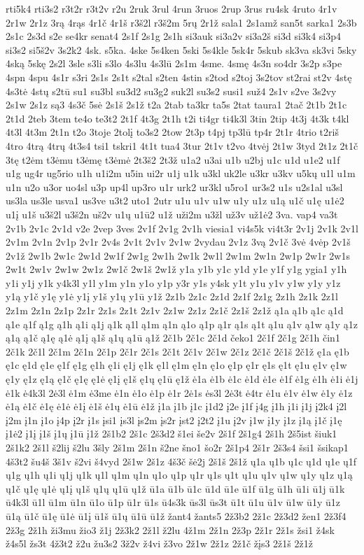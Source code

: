 {rti5k4
rti3s2
r3t2r
r3t2v
r2u
2ruk
3rul
4run
3ruos
2rup
3rus
ru4sk
4ruto
4r1v
2r1w
2r1z
3rą
4rąs
4r1č
4r1š
r3š2l
r3š2m
5rų
2r1ž
sala1
2s1amž
san5t
sarka1
2s3b
2s1c
2s3d
s2e
se4kr
senat4
2s1f
2s1g
2s1h
si3auk
si3a2v
si3a2š
si3d
si3k4
si3p4
si3s2
si5š2v
3s2k2
4sk.
s5ka.
4ske
5s4ken
5ski
5s4kle
5sk4r
5skub
sk3va
sk3vi
5sky
4ską
5skę
2s2l
3sle
s3li
s3lo
4s3lu
4s3lū
2s1m
4sme.
4smę
4s3n
so4dr
3s2p
s3pe
4spn
4spu
4s1r
s3ri
2s1s
2s1t
s2tal
s2ten
4stin
s2tod
s2toj
3s2tov
st2rai
st2v
4stę
4s3tė
4stų
s2tū
su1
su3bl
su3d2
su3g2
suk2l
su3s2
susi1
suž4
2s1v
s2ve
3s2vy
2s1w
2s1z
są3
4s3č
5sė
2s1š
2s1ž
t2a
2tab
ta3kr
ta5s
2tat
taura1
2tač
2t1b
2t1c
2t1d
2teb
3tem
te4o
te3t2
2t1f
4t3g
2t1h
t2i
ti4gr
ti4k3l
3tin
2tip
4t3j
4t3k
t4kl
4t3l
4t3m
2t1n
t2o
3toje
2tolį
to3s2
2tow
2t3p
t4pj
tp3lū
tp4r
2t1r
4trio
t2riš
4tro
4trą
4trų
4t3s4
tsi1
tskri1
4t1t
tua4
3tur
2t1v
t2vo
4tvėj
2t1w
3tyd
2t1z
2t1č
3tę
t2ėm
t3ėmu
t3ėmę
t3ėmė
2t3š2
2t3ž
u1a2
u3ai
u1b
u2bj
u1c
u1d
u1e2
u1f
u1g
ug4r
ug5rio
u1h
u1i2m
u5in
ui2r
u1j
u1k
u3kl
uk2le
u3kr
u3kv
u5kų
u1l
u1m
u1n
u2o
u3or
uo4sl
u3p
up4l
up3ro
u1r
urk2
ur3kl
u5ro1
ur3s2
u1s
u2s1al
u3sl
us3la
us3le
usva1
us3ve
u3t2
uto1
2utr
u1u
u1v
u1w
u1y
u1z
u1ą
u1č
u1ę
u1ė2
u1į
u1š
u3š2l
u3š2n
uš2v
u1ų
u1ū2
u1ž
uži2m
u3žl
už3v
už1ė2
3va.
vap4
va3t
2v1b
2v1c
2v1d
v2e
2vep
3ves
2v1f
2v1g
2v1h
viesia1
vi4s5k
vi4t3r
2v1j
2v1k
2v1l
2v1m
2v1n
2v1p
2v1r
2v4s
2v1t
2v1v
2v1w
2vydau
2v1z
3vą
2v1č
3vė
4vėp
2v1š
2v1ž
2w1b
2w1c
2w1d
2w1f
2w1g
2w1h
2w1k
2w1l
2w1m
2w1n
2w1p
2w1r
2w1s
2w1t
2w1v
2w1w
2w1z
2w1č
2w1š
2w1ž
y1a
y1b
y1c
y1d
y1e
y1f
y1g
ygia1
y1h
y1i
y1j
y1k
y4k3l
y1l
y1m
y1n
y1o
y1p
y3r
y1s
y4sk
y1t
y1u
y1v
y1w
y1y
y1z
y1ą
y1č
y1ę
y1ė
y1į
y1š
y1ų
y1ū
y1ž
2z1b
2z1c
2z1d
2z1f
2z1g
2z1h
2z1k
2z1l
2z1m
2z1n
2z1p
2z1r
2z1s
2z1t
2z1v
2z1w
2z1z
2z1č
2z1š
2z1ž
ą1a
ą1b
ą1c
ą1d
ą1e
ą1f
ą1g
ą1h
ą1i
ą1j
ą1k
ą1l
ą1m
ą1n
ą1o
ą1p
ą1r
ą1s
ą1t
ą1u
ą1v
ą1w
ą1y
ą1z
ą1ą
ą1č
ą1ę
ą1ė
ą1į
ą1š
ą1ų
ą1ū
ą1ž
2č1b
2č1c
2č1d
čeko1
2č1f
2č1g
2č1h
čin1
2č1k
2č1l
2č1m
2č1n
2č1p
2č1r
2č1s
2č1t
2č1v
2č1w
2č1z
2č1č
2č1š
2č1ž
ę1a
ę1b
ę1c
ę1d
ę1e
ę1f
ę1g
ę1h
ę1i
ę1j
ę1k
ę1l
ę1m
ę1n
ę1o
ę1p
ę1r
ę1s
ę1t
ę1u
ę1v
ę1w
ę1y
ę1z
ę1ą
ę1č
ę1ę
ę1ė
ę1į
ę1š
ę1ų
ę1ū
ę1ž
ė1a
ė1b
ė1c
ė1d
ė1e
ė1f
ė1g
ė1h
ė1i
ė1j
ė1k
ė4k3l
2ė3l
ė1m
ė3me
ė1n
ė1o
ė1p
ė1r
2ė1s
ės3l
2ė3t
ė4tr
ė1u
ė1v
ė1w
ė1y
ė1z
ė1ą
ė1č
ė1ę
ė1ė
ė1į
ė1š
ė1ų
ė1ū
ė1ž
į1a
į1b
į1c
į1d2
į2e
į1f
į4g
į1h
į1i
į1j
į2k4
į2l
į2m
į1n
į1o
į4p
į2r
į1s
įsi1
įs3l
įs2m
įs2r
įst2
į2t2
į1u
į2v
į1w
į1y
į1z
į1ą
į1č
į1ę
į1ė2
į1į
į1š
į1ų
į1ū
į1ž
2š1b2
2š1c
2š3d2
š1ei
še2v
2š1f
2š1g4
2š1h
2š5ist
šiuk1
2š1k2
2š1l
š2lij
š2lu
3šly
2š1m
2š1n
š2ne
šno1
šo2r
2š1p4
2š1r
2š3s4
šsi1
šsikap1
4š3t2
šu4š
3š1v
š2vi
š4vyd
2š1w
2š1z
4š3č
šė2j
2š1š
2š1ž
ų1a
ų1b
ų1c
ų1d
ų1e
ų1f
ų1g
ų1h
ų1i
ų1j
ų1k
ų1l
ų1m
ų1n
ų1o
ų1p
ų1r
ų1s
ų1t
ų1u
ų1v
ų1w
ų1y
ų1z
ų1ą
ų1č
ų1ę
ų1ė
ų1į
ų1š
ų1ų
ų1ū
ų1ž
ū1a
ū1b
ū1c
ū1d
ū1e
ū1f
ū1g
ū1h
ū1i
ū1j
ū1k
ū4k3l
ū1l
ū1m
ū1n
ū1o
ū1p
ū1r
ū1s
ū4s3k
ūs3l
ūs3t
ū1t
ū1u
ū1v
ū1w
ū1y
ū1z
ū1ą
ū1č
ū1ę
ū1ė
ū1į
ū1š
ū1ų
ū1ū
ū1ž
žant4
žants5
2ž3b2
2ž1c
2ž3d2
žen1
2ž3f4
2ž3g
2ž1h
ži3mu
žio3
ž1j
2ž3k2
2ž1l
ž2lu
4ž1m
2ž1n
2ž3p
2ž1r
2ž1s
žsi1
ž4sk
ž4s5l
žs3t
4ž3t2
ž2u
žu3s2
3ž2v
ž4vi
ž3vo
2ž1w
2ž1z
2ž1č
žįs3
2ž1š
2ž1ž
}
